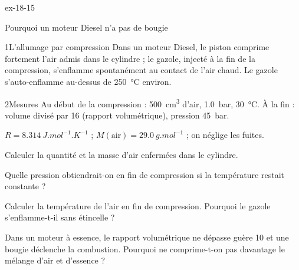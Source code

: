 \begin{blocLivre}{ex-18-15}
\begin{exercice}[3]{Pourquoi un moteur Diesel n'a pas de bougie}
\begin{docu}{1}{L'allumage par compression}
Dans un moteur Diesel, le piston comprime fortement l'air admis dans le cylindre ; le gazole, injecté à la fin de la
compression, s'enflamme spontanément au contact de l'air chaud. Le gazole s'auto-enflamme au-dessus de
\qty{250}{\degreeCelsius} environ.
\end{docu}
\begin{docu}{2}{Mesures}
Au début de la compression : \qty{500}{cm^3} d'air, \qty{1,0}{bar}, \qty{30}{\degreeCelsius}. À la fin : volume divisé par 16
(rapport volumétrique), pression \qty{45}{bar}.
\end{docu}
\begin{donnees}
$R=\qty{8,314}{J.mol^{-1}.K^{-1}}$ ; $M(\text{air})=\qty{29,0}{g.mol^{-1}}$ ; on néglige les fuites.
\end{donnees}
\begin{questions}
\item Calculer la quantité et la masse d'air enfermées dans le cylindre.
\item Quelle pression obtiendrait-on en fin de compression si la température restait constante ?
\item \initiative Calculer la température de l'air en fin de compression. Pourquoi le gazole s'enflamme-t-il sans
étincelle ?
\item Dans un moteur à essence, le rapport volumétrique ne dépasse guère 10 et une bougie déclenche la combustion.
Pourquoi ne comprime-t-on pas davantage le mélange d'air et d'essence ?
\end{questions}
\end{exercice}
\end{blocLivre}
